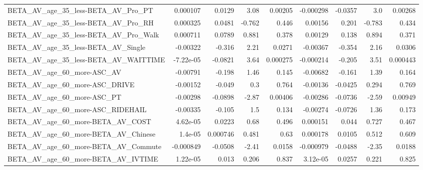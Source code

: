 \begin{tabular}{lrrrrrrrr}
BETA\_AV\_age\_35\_less-BETA\_AV\_Pro\_PT                 &    0.000107 &       0.0129 &     3.08 &  0.00205 &  -0.000298 &     -0.0357 &          3.0 &       0.00268 \\
BETA\_AV\_age\_35\_less-BETA\_AV\_Pro\_RH                 &    0.000325 &       0.0481 &   -0.762 &    0.446 &    0.00156 &       0.201 &       -0.783 &         0.434 \\
BETA\_AV\_age\_35\_less-BETA\_AV\_Pro\_Walk               &    0.000711 &       0.0789 &    0.881 &    0.378 &    0.00129 &       0.138 &        0.894 &         0.371 \\
BETA\_AV\_age\_35\_less-BETA\_AV\_Single                 &    -0.00322 &       -0.316 &     2.21 &   0.0271 &   -0.00367 &      -0.354 &         2.16 &        0.0306 \\
BETA\_AV\_age\_35\_less-BETA\_AV\_WAITTIME               &   -7.22e-05 &      -0.0821 &     3.64 & 0.000275 &  -0.000214 &      -0.205 &         3.51 &      0.000443 \\
BETA\_AV\_age\_60\_more-ASC\_AV                         &    -0.00791 &       -0.198 &     1.46 &    0.145 &   -0.00682 &      -0.161 &         1.39 &         0.164 \\
BETA\_AV\_age\_60\_more-ASC\_DRIVE                      &    -0.00152 &       -0.049 &      0.3 &    0.764 &   -0.00136 &     -0.0425 &        0.294 &         0.769 \\
BETA\_AV\_age\_60\_more-ASC\_PT                         &    -0.00298 &      -0.0898 &    -2.87 &  0.00406 &   -0.00286 &     -0.0736 &        -2.59 &       0.00949 \\
BETA\_AV\_age\_60\_more-ASC\_RIDEHAIL                   &    -0.00335 &       -0.105 &      1.5 &    0.134 &   -0.00274 &     -0.0726 &         1.36 &         0.173 \\
BETA\_AV\_age\_60\_more-BETA\_AV\_COST                   &    4.62e-05 &       0.0223 &     0.68 &    0.496 &   0.000151 &       0.044 &        0.727 &         0.467 \\
BETA\_AV\_age\_60\_more-BETA\_AV\_Chinese                &     1.4e-05 &     0.000746 &    0.481 &     0.63 &   0.000178 &      0.0105 &        0.512 &         0.609 \\
BETA\_AV\_age\_60\_more-BETA\_AV\_Commute                &   -0.000849 &      -0.0508 &    -2.41 &   0.0158 &  -0.000979 &     -0.0488 &        -2.35 &        0.0188 \\
BETA\_AV\_age\_60\_more-BETA\_AV\_IVTIME                 &    1.22e-05 &        0.013 &    0.206 &    0.837 &   3.12e-05 &      0.0257 &        0.221 &         0.825 \\

\end{tabular}
